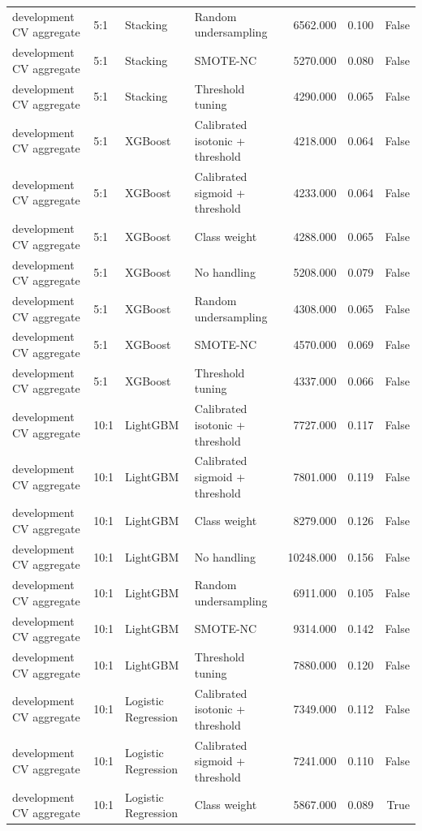 \begin{tabular}{llllrrr}
development CV aggregate & 5:1 & Stacking & Random undersampling & 6562.000 & 0.100 & False \\
development CV aggregate & 5:1 & Stacking & SMOTE-NC & 5270.000 & 0.080 & False \\
development CV aggregate & 5:1 & Stacking & Threshold tuning & 4290.000 & 0.065 & False \\
development CV aggregate & 5:1 & XGBoost & Calibrated isotonic + threshold & 4218.000 & 0.064 & False \\
development CV aggregate & 5:1 & XGBoost & Calibrated sigmoid + threshold & 4233.000 & 0.064 & False \\
development CV aggregate & 5:1 & XGBoost & Class weight & 4288.000 & 0.065 & False \\
development CV aggregate & 5:1 & XGBoost & No handling & 5208.000 & 0.079 & False \\
development CV aggregate & 5:1 & XGBoost & Random undersampling & 4308.000 & 0.065 & False \\
development CV aggregate & 5:1 & XGBoost & SMOTE-NC & 4570.000 & 0.069 & False \\
development CV aggregate & 5:1 & XGBoost & Threshold tuning & 4337.000 & 0.066 & False \\
development CV aggregate & 10:1 & LightGBM & Calibrated isotonic + threshold & 7727.000 & 0.117 & False \\
development CV aggregate & 10:1 & LightGBM & Calibrated sigmoid + threshold & 7801.000 & 0.119 & False \\
development CV aggregate & 10:1 & LightGBM & Class weight & 8279.000 & 0.126 & False \\
development CV aggregate & 10:1 & LightGBM & No handling & 10248.000 & 0.156 & False \\
development CV aggregate & 10:1 & LightGBM & Random undersampling & 6911.000 & 0.105 & False \\
development CV aggregate & 10:1 & LightGBM & SMOTE-NC & 9314.000 & 0.142 & False \\
development CV aggregate & 10:1 & LightGBM & Threshold tuning & 7880.000 & 0.120 & False \\
development CV aggregate & 10:1 & Logistic Regression & Calibrated isotonic + threshold & 7349.000 & 0.112 & False \\
development CV aggregate & 10:1 & Logistic Regression & Calibrated sigmoid + threshold & 7241.000 & 0.110 & False \\
development CV aggregate & 10:1 & Logistic Regression & Class weight & 5867.000 & 0.089 & True \\

\end{tabular}
